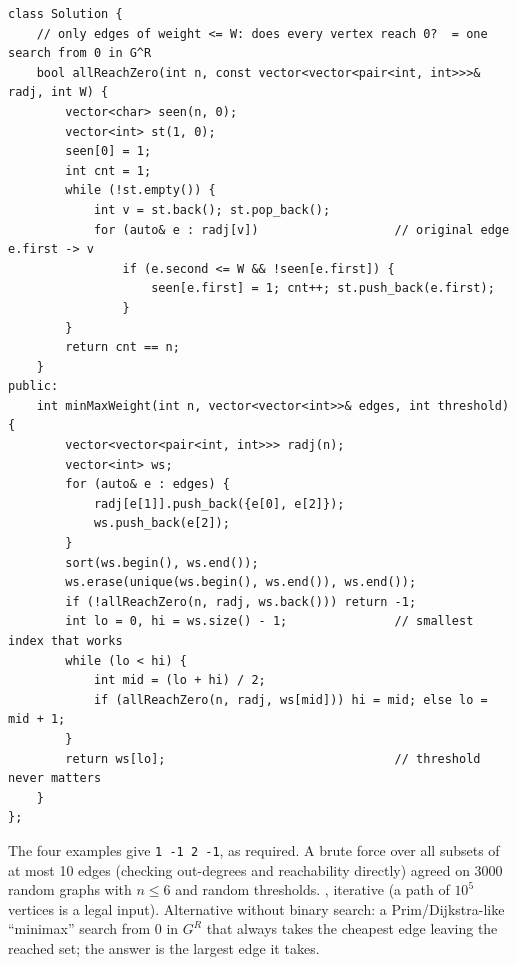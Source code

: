 \begin{solutionbox}
\begin{lstlisting}[style=cpp]
class Solution {
    // only edges of weight <= W: does every vertex reach 0?  = one search from 0 in G^R
    bool allReachZero(int n, const vector<vector<pair<int, int>>>& radj, int W) {
        vector<char> seen(n, 0);
        vector<int> st(1, 0);
        seen[0] = 1;
        int cnt = 1;
        while (!st.empty()) {
            int v = st.back(); st.pop_back();
            for (auto& e : radj[v])                   // original edge e.first -> v
                if (e.second <= W && !seen[e.first]) {
                    seen[e.first] = 1; cnt++; st.push_back(e.first);
                }
        }
        return cnt == n;
    }
public:
    int minMaxWeight(int n, vector<vector<int>>& edges, int threshold) {
        vector<vector<pair<int, int>>> radj(n);
        vector<int> ws;
        for (auto& e : edges) {
            radj[e[1]].push_back({e[0], e[2]});
            ws.push_back(e[2]);
        }
        sort(ws.begin(), ws.end());
        ws.erase(unique(ws.begin(), ws.end()), ws.end());
        if (!allReachZero(n, radj, ws.back())) return -1;
        int lo = 0, hi = ws.size() - 1;               // smallest index that works
        while (lo < hi) {
            int mid = (lo + hi) / 2;
            if (allReachZero(n, radj, ws[mid])) hi = mid; else lo = mid + 1;
        }
        return ws[lo];                                // threshold never matters
    }
};
\end{lstlisting}
The four examples give \texttt{1 -1 2 -1}, as required. A brute force over all subsets of at most 10 edges (checking out-degrees and reachability directly) agreed on 3000 random graphs with $n \le 6$ and random thresholds. , iterative (a path of $10^5$ vertices is a legal input). Alternative without binary search: a Prim/Dijkstra-like ``minimax'' search from 0 in $G^R$ that always takes the cheapest edge leaving the reached set; the answer is the largest edge it takes.
\end{solutionbox}
